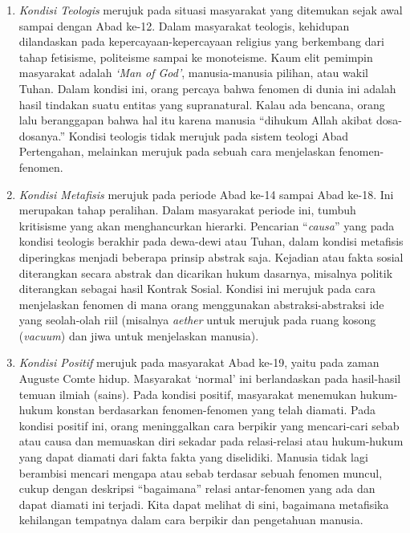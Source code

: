 \documentclass[10pt,a4paper]{article}
\def\tightlist{}
\begin{document}
\begin{multicols}{2}
\begin{enumerate}
\def\labelenumi{\arabic{enumi}.}
\tightlist
\item
  \emph{Kondisi Teologis} merujuk pada situasi masyarakat yang ditemukan
  sejak awal sampai dengan Abad ke-12. Dalam masyarakat teologis,
  kehidupan dilandaskan pada kepercayaan-kepercayaan religius yang
  berkembang dari tahap fetisisme, politeisme sampai ke monoteisme. Kaum
  elit pemimpin masyarakat adalah \emph{`Man of God'}, manusia-manusia
  pilihan, atau wakil Tuhan. Dalam kondisi ini, orang percaya bahwa
  fenomen di dunia ini adalah hasil tindakan suatu entitas yang
  supranatural. Kalau ada bencana, orang lalu beranggapan bahwa hal itu
  karena manusia ``dihukum Allah akibat dosa-dosanya.'' Kondisi teologis
  tidak merujuk pada sistem teologi Abad Pertengahan, melainkan merujuk
  pada sebuah cara menjelaskan fenomen-fenomen.
\item
  \emph{Kondisi Metafisis} merujuk pada periode Abad ke-14 sampai Abad
  ke-18. Ini merupakan tahap peralihan. Dalam masyarakat periode ini,
  tumbuh kritisisme yang akan menghancurkan hierarki. Pencarian
  ``\emph{causa}'' yang pada kondisi teologis berakhir pada dewa-dewi
  atau Tuhan, dalam kondisi metafisis diperingkas menjadi beberapa
  prinsip abstrak saja. Kejadian atau fakta sosial diterangkan secara
  abstrak dan dicarikan hukum dasarnya, misalnya politik diterangkan
  sebagai hasil Kontrak Sosial. Kondisi ini merujuk pada cara
  menjelaskan fenomen di mana orang menggunakan abstraksi-abstraksi ide
  yang seolah-olah riil (misalnya \emph{aether} untuk merujuk pada ruang
  kosong (\emph{vacuum}) dan jiwa untuk menjelaskan manusia).
\item
  \emph{Kondisi Positif} merujuk pada masyarakat Abad ke-19, yaitu pada
  zaman Auguste Comte hidup. Masyarakat `normal' ini berlandaskan pada
  hasil-hasil temuan ilmiah (sains). Pada kondisi positif, masyarakat
  menemukan hukum-hukum konstan berdasarkan fenomen-fenomen yang telah
  diamati. Pada kondisi positif ini, orang meninggalkan cara berpikir
  yang mencari-cari sebab atau causa dan memuaskan diri sekadar pada
  relasi-relasi atau hukum-hukum yang dapat diamati dari fakta fakta
  yang diselidiki. Manusia tidak lagi berambisi mencari mengapa atau
  sebab terdasar sebuah fenomen muncul, cukup dengan deskripsi
  ``bagaimana'' relasi antar-fenomen yang ada dan dapat diamati ini
  terjadi. Kita dapat melihat di sini, bagaimana metafisika kehilangan
  tempatnya dalam cara berpikir dan pengetahuan manusia.
\end{enumerate}


\end{multicols}
\end{document}
